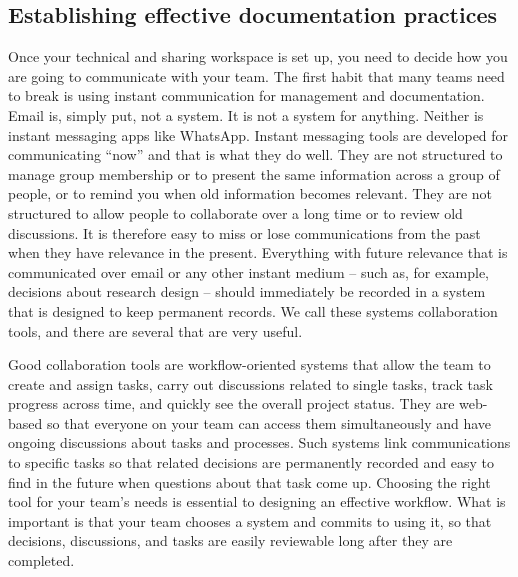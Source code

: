 \documentclass[
]{book}
\begin{document}
\hypertarget{establishing-effective-documentation-practices}{%
\subsection*{Establishing effective documentation practices}\label{establishing-effective-documentation-practices}}

Once your technical and sharing workspace is set up,
you need to decide how you are going to communicate with your team.
The first habit that many teams need to break
is using instant communication for management and documentation.
Email is, simply put, not a system. It is not a system for anything.
Neither is instant messaging apps like WhatsApp.
Instant messaging tools are developed for communicating ``now'' and that is what they do well.
They are not structured to manage group membership or to present the same information
across a group of people, or to remind you when old information becomes relevant.
They are not structured to allow people to collaborate over a long time or to review old discussions.
It is therefore easy to miss or lose communications from the past when they have relevance in the present.
Everything with future relevance that is communicated over email or any other instant medium
-- such as, for example, decisions about research design --
should immediately be recorded in a system that is designed to keep permanent records.
We call these systems collaboration tools, and there are several that are very useful.

Good collaboration tools are workflow-oriented systems
that allow the team to create and assign tasks,
carry out discussions related to single tasks,
track task progress across time, and quickly see the overall project status.
They are web-based so that everyone on your team can access them simultaneously
and have ongoing discussions about tasks and processes.
Such systems link communications to specific tasks so that
related decisions are permanently recorded
and easy to find in the future when questions about that task come up.
Choosing the right tool for your team's needs is essential to designing an effective workflow.
What is important is that your team chooses a system and commits to using it,
so that decisions, discussions, and tasks are easily reviewable long after they are completed.
\end{document}
